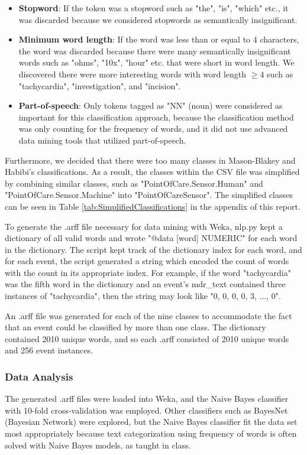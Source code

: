 \documentclass[11pt, notitlepage,abstracton,oneside]{article}   	%
\begin{document}
\begin{itemize}
	\item \textbf{Stopword}: If the token was a stopword such as "the", "is", "which" etc., it was discarded because we considered stopwords as semantically insignificant.
	\item \textbf{Minimum word length}: If the word was less than or equal to 4 characters, the word was discarded because there were many semantically insignificant words such as "ohms", "10x", "hour" etc. that were short in word length. We discovered there were more interesting words with word length $\geq 4$ such as "tachycardia", "investigation", and "incision".
	\item \textbf{Part-of-speech}: Only tokens tagged as "NN" (noun) were considered as important for this classification approach, because the classification method was only counting for the frequency of words, and it did not use advanced data mining tools that utilized part-of-speech.
\end{itemize}

Furthermore, we decided that there were too many classes in Mason-Blakey and Habibi's classifications. As a result, the classes within the CSV file was simplified by combining similar classes, such as "PointOfCare.Sensor.Human" and "PointOfCare.Sensor.Machine" into "PointOfCareSensor". The simplified classes can be seen in Table \ref{tab:SimplifiedClassifications} in the appendix of this report.

To generate the .arff file necessary for data mining with Weka, nlp.py kept a dictionary of all valid words and wrote "@data [word] NUMERIC" for each word in the dictionary. The script kept track of the dictionary index for each word, and for each event, the script generated a string which encoded the count of words with the count in its appropriate index. For example, if the word "tachycardia" was the fifth word in the dictionary and an event's mdr\_text contained three instances of "tachycardia", then the string may look like "0, 0, 0, 0, 3, ..., 0".

An .arff file was generated for each of the nine classes to accommodate the fact that an event could be classified by more than one class. The dictionary contained 2010 unique words, and so each .arff consisted of 2010 unique words and 256 event instances.

\subsubsection{Data Analysis}
The generated .arff files were loaded into Weka, and the Naive Bayes classifier with 10-fold cross-validation was employed. Other classifiers such as BayesNet (Bayesian Network) were explored, but the Naive Bayes classifier fit the data set most appropriately because text categorization using frequency of words is often solved with Naive Bayes models, as taught in class.
\end{document}
